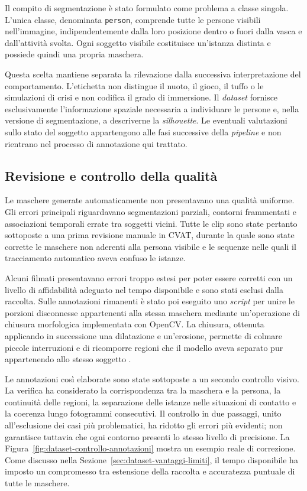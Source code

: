 Il compito di segmentazione è stato formulato come problema a classe singola. L'unica classe, denominata \texttt{person}, comprende tutte le persone visibili nell'immagine, indipendentemente dalla loro posizione dentro o fuori dalla vasca e dall'attività svolta. Ogni soggetto visibile costituisce un'istanza distinta e possiede quindi una propria maschera.

Questa scelta mantiene separata la rilevazione dalla successiva interpretazione del comportamento. L'etichetta non distingue il nuoto, il gioco, il tuffo o le simulazioni di crisi e non codifica il grado di immersione. Il \textit{dataset} fornisce esclusivamente l'informazione spaziale necessaria a individuare le persone e, nella versione di segmentazione, a descriverne la \textit{silhouette}. Le eventuali valutazioni sullo stato del soggetto appartengono alle fasi successive della \textit{pipeline} e non rientrano nel processo di annotazione qui trattato.

\subsection{Revisione e controllo della qualità}

Le maschere generate automaticamente non presentavano una qualità uniforme. Gli errori principali riguardavano segmentazioni parziali, contorni frammentati e associazioni temporali errate tra soggetti vicini. Tutte le clip sono state pertanto sottoposte a una prima revisione manuale in CVAT, durante la quale sono state corrette le maschere non aderenti alla persona visibile e le sequenze nelle quali il tracciamento automatico aveva confuso le istanze.

Alcuni filmati presentavano errori troppo estesi per poter essere corretti con un livello di affidabilità adeguato nel tempo disponibile e sono stati esclusi dalla raccolta. Sulle annotazioni rimanenti è stato poi eseguito uno \textit{script} per unire le porzioni disconnesse appartenenti alla stessa maschera mediante un'operazione di chiusura morfologica implementata con OpenCV. La chiusura, ottenuta applicando in successione una dilatazione e un'erosione, permette di colmare piccole interruzioni e di ricomporre regioni che il modello aveva separato pur appartenendo allo stesso soggetto \cite{OpenCVClosing}.

Le annotazioni così elaborate sono state sottoposte a un secondo controllo visivo. La verifica ha considerato la corrispondenza tra la maschera e la persona, la continuità delle regioni, la separazione delle istanze nelle situazioni di contatto e la coerenza lungo fotogrammi consecutivi. Il controllo in due passaggi, unito all'esclusione dei casi più problematici, ha ridotto gli errori più evidenti; non garantisce tuttavia che ogni contorno presenti lo stesso livello di precisione. La Figura~\ref{fig:dataset-controllo-annotazioni} mostra un esempio reale di correzione. Come discusso nella Sezione~\ref{sec:dataset-vantaggi-limiti}, il tempo disponibile ha imposto un compromesso tra estensione della raccolta e accuratezza puntuale di tutte le maschere.

